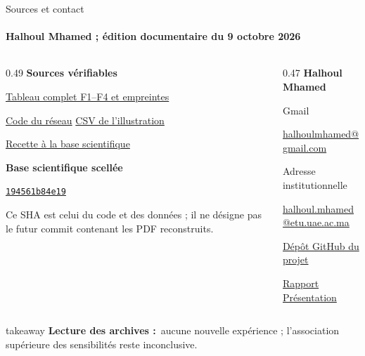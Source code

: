\documentclass[aspectratio=169,11pt]{beamer}
\newcommand{\takeaway}[2]{%
  \begin{beamercolorbox}[wd=\linewidth,sep=7pt]{takeaway}
  \small\textbf{#1}\ #2
  \end{beamercolorbox}}
\begin{document}
\begin{frame}[t]{Sources et contact}
\framesubtitle{Halhoul Mhamed ; édition documentaire du 9 octobre 2026}
\begin{columns}[T,onlytextwidth]
\begin{column}{0.49\textwidth}
\textbf{Sources vérifiables}\par\vspace{0.16cm}
\href{https://github.com/halhoulmhamed-droid/nn-optimization-benchmark/blob/main/docs/figure_provenance.md}{Tableau complet F1--F4 et empreintes}\par\vspace{0.12cm}
\href{https://github.com/halhoulmhamed-droid/nn-optimization-benchmark/blob/194561b84e190d953f85d1f01281f0d758907a05/src/neural_surrogate.py}{Code du réseau}\quad
\href{https://github.com/halhoulmhamed-droid/nn-optimization-benchmark/blob/194561b84e190d953f85d1f01281f0d758907a05/report/data/learned_curves.csv}{CSV de l'illustration}\par\vspace{0.12cm}
\href{https://github.com/halhoulmhamed-droid/nn-optimization-benchmark/blob/194561b84e190d953f85d1f01281f0d758907a05/docs/reproducibility.md}{Recette à la base scientifique}\par\vspace{0.18cm}
\textbf{Base scientifique scellée}\par
\href{https://github.com/halhoulmhamed-droid/nn-optimization-benchmark/commit/194561b84e190d953f85d1f01281f0d758907a05}{\texttt{194561b84e19}}\par\vspace{0.12cm}
\small Ce SHA est celui du code et des données ; il ne désigne pas le
futur commit contenant les PDF reconstruits.
\end{column}
\begin{column}{0.47\textwidth}
\textbf{Halhoul Mhamed}\par\vspace{0.18cm}
\small Gmail\par
\href{mailto:halhoulmhamed@gmail.com}{halhoulmhamed@gmail.com}\par\vspace{0.18cm}
Adresse institutionnelle\par
\href{mailto:halhoul.mhamed@etu.uae.ac.ma}{halhoul.mhamed@etu.uae.ac.ma}\par\vspace{0.18cm}
\href{https://github.com/halhoulmhamed-droid/nn-optimization-benchmark}{Dépôt GitHub du projet}\par\vspace{0.16cm}
\href{https://github.com/halhoulmhamed-droid/nn-optimization-benchmark/blob/main/report/main.pdf}{Rapport}\quad
\href{https://github.com/halhoulmhamed-droid/nn-optimization-benchmark/blob/main/slides/main.pdf}{Présentation}
\end{column}
\end{columns}
\vfill
\takeaway{Lecture des archives :}{aucune nouvelle expérience ; l'association supérieure des sensibilités reste inconclusive.}
\end{frame}
\end{document}
